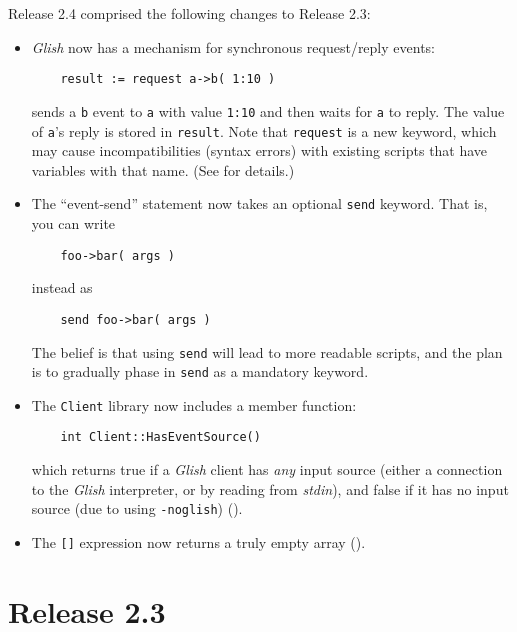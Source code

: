 Release 2.4 comprised the following changes to Release 2.3:
\begin{itemize}

\item \emph{Glish} now has a mechanism for synchronous request/reply events:
\begin{verbatim}
    result := request a->b( 1:10 )
\end{verbatim}
sends a \texttt{b} event to \texttt{a} with value \texttt{1:10} and then waits for
\texttt{a} to reply.  The value of \texttt{a}'s reply is stored in \texttt{result}.
Note that \texttt{request} is a new keyword, which may cause incompatibilities
(syntax errors) with existing scripts that have variables with that name.
(See  for details.)

\item The ``event-send'' statement now takes an optional \texttt{send} keyword.
That is, you can write
\begin{verbatim}
    foo->bar( args )
\end{verbatim}
instead as
\begin{verbatim}
    send foo->bar( args )
\end{verbatim}
The belief is that using \texttt{send} will lead to more readable scripts,
and the plan is to gradually phase in \texttt{send} as a mandatory keyword.

\item The \texttt{Client} library now includes a member function:
\begin{verbatim}
    int Client::HasEventSource()
\end{verbatim}
which returns true if a \emph{Glish} client has \emph{any} input source (either
a connection to the \emph{Glish} interpreter, or by reading from \emph{stdin\/}),
and false if it has no input source (due to using \texttt{-noglish})
().

\item The \texttt{[]} expression now returns a truly empty array
(). 

\end{itemize}

\section{Release 2.3}

